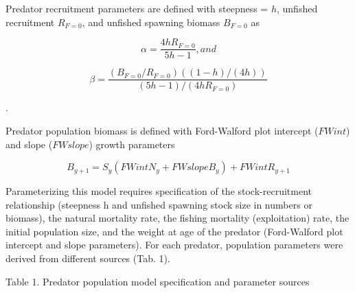 \documentclass[]{article}
\begin{document}
Predator recruitment parameters are defined with steepness = \(h\),
unfished recruitment \(R_{F=0}\), and unfished spawning biomass
\(B_{F=0}\) as

\begin{equation}
\alpha = \frac{4hR_{F=0}}{5h-1} \label{predalpha_equation}, and
\end{equation}

\begin{equation}
\beta = \frac{(B_{F=0}/R_{F=0})((1-h)/(4h))}{(5h-1)/(4hR_{F=0})} \label{predbeta_equation}
\end{equation}

.

Predator population biomass is defined with Ford-Walford plot intercept
(\(FWint\)) and slope (\(FWslope\)) growth parameters

\begin{equation}
B_{y+1} = S_{y} (FWint N_{y} + FWslope B_{y}) + FWint R_{y+1} \label{delaydiffB_equation}
\end{equation}

Parameterizing this model requires specification of the
stock-recruitment relationship (steepness h and unfished spawning stock
size in numbers or biomass), the natural mortality rate, the fishing
mortality (exploitation) rate, the initial population size, and the
weight at age of the predator (Ford-Walford plot intercept and slope
parameters). For each predator, population parameters were derived from
different sources (Tab. 1).

Table 1. Predator population model specification and parameter sources
\end{document}
